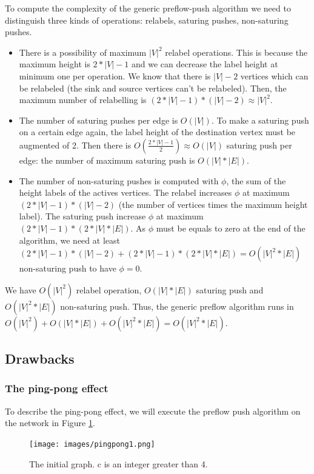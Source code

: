To compute the complexity of the generic preflow-push algorithm we need to distinguish three kinds of operations: relabels, saturing pushes, non-saturing pushes.
\begin{itemize}
\item There is a possibility of maximum $|V|^2$ relabel operations. This is because the maximum height is $2*|V| - 1$ and we can decrease the label height at minimum one per operation. We know that there is $|V| - 2$ vertices which can be relabeled (the sink and source vertices can't be relabeled). Then, the maximum number of relabelling is $(2*|V| - 1) * (|V| - 2) \approx |V|^2$.

\item The number of saturing pushes per edge is $O(|V|)$. To make a saturing push on a certain edge again, the label height of the destination vertex must be augmented of 2. Then there is $O(\frac{2*|V| - 1}{2}) \approx O(|V|)$ saturing push per edge: the number of maximum saturing push is $O(|V|*|E|)$.

\item The number of non-saturing pushes is computed with $\phi$, the sum of the height labels of the actives vertices. The relabel increases $\phi$ at maximum $(2*|V| - 1)*(|V|-2)$ (the number of vertices times the maximum height label). The saturing push increase $\phi$ at maximum $(2*|V|-1)*(2*|V|*|E|)$. As $\phi$ must be equals to zero at the end of the algorithm, we need at least $(2*|V|-1)*(|V|-2) + (2*|V|-1)*(2*|V|*|E|) = O(|V|^2*|E|)$ non-saturing push to have $\phi = 0$.
\end{itemize}
We have $O(|V|^2)$ relabel operation, $O(|V|*|E|)$ saturing push and $O(|V|^2*|E|)$ non-saturing push. Thus, the generic preflow algorithm runs in $O(|V|^2) + O(|V|*|E|) + O(|V|^2*|E|) = O(|V|^2 *|E|)$. 

\subsection{Drawbacks}

\subsubsection{The ping-pong effect}

To describe the ping-pong effect, we will execute the preflow push algorithm on the network in Figure \ref{img:pingpong1}.

\begin{figure}[H]
\centering
\texttt{[image: images/pingpong1.png]}
\caption{The initial graph. c is an integer greater than 4.}
\label{img:pingpong1}
\end{figure}

